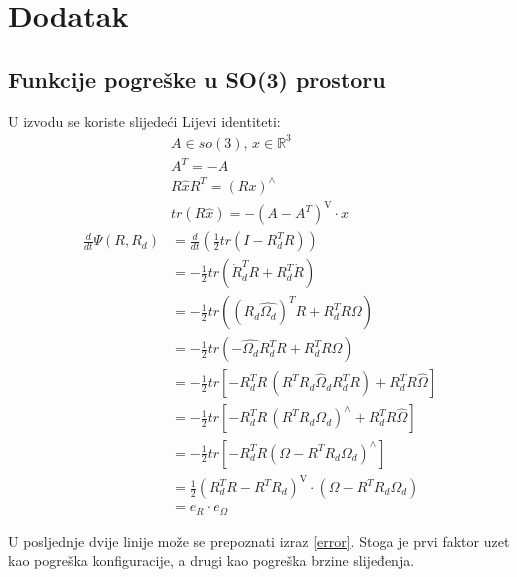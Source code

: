 \documentclass[times, utf8, diplomski]{fer}
\begin{document}
\chapter{Dodatak}
	\section{Funkcije pogreške u SO(3) prostoru}
	
	U izvodu se koriste slijedeći Lijevi identiteti:
	\begin{gather}
		A\in so(3), \,  x\in\mathbb{R}^3 \\
		A^T = -A \\
		R \hat{x}R^T = (Rx)^\wedge \\
		tr(R\hat{x}) = - (A - A^T)^\text{V} \cdot x
	\end{gather}
	\begin{align*}
		\frac{d}{dt}\Psi(R, R_d) &= \frac{d}{dt} ( \frac{1}{2} tr(I - R_d^TR)) \\
		&= - \frac{1}{2}tr(\dot{R}_d^TR + R_d^T\dot{R}) \\
		&= - \frac{1}{2}tr( (R_d \hat{\Omega_d})^TR + R_d^TR\Omega ) \\
		&=  - \frac{1}{2}tr( -\hat{\Omega_d}R_d^TR + R_d^TR\hat{\Omega}) \\
		&= - \frac{1}{2}tr[ -R_d^TR \, (R^TR_d\hat{\Omega}_dR_d^TR) + R_d^TR\hat{\Omega} ] \\
		&=  - \frac{1}{2}tr[ -R_d^TR \, (R^TR_d\Omega_d)^\wedge + R_d^TR\hat{\Omega} ] \\
		&= - \frac{1}{2}tr[ -R_d^TR (\Omega - R^TR_d\Omega_d)^\wedge ] \\
		&= \frac{1}{2}(R_d^TR - R^TR_d)^\text{V} \cdot (\Omega - R^TR_d\Omega_d) \\
		&= e_R \cdot e_\Omega
	\end{align*}
	
	U posljednje dvije linije može se prepoznati izraz \ref{error}. Stoga je prvi faktor uzet kao pogreška konfiguracije, a drugi kao pogreška brzine slijeđenja.
	
	\newpage
	\clearpage
	
\end{document}
